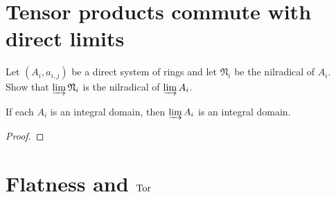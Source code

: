 \section*{Tensor products commute with direct limits}




\begin{exercise}
\label{ex:2.20}

\end{exercise}




\begin{exercise}
\label{ex:2.21}

\end{exercise}




\begin{exercise}
\label{ex:2.22}
Let $(A_i, a_{i,j})$ be a direct system of rings and let $\mathfrak N_i$ be the nilradical of $A_i$.
Show that $\varinjlim \mathfrak N_i$ is the nilradical of $\varinjlim A_i$.

If each $A_i$ is an integral domain, then $\varinjlim A_i$ is an integral domain.
\end{exercise}

\begin{proof}

\end{proof}


\begin{exercise}
\label{ex:2.23}

\end{exercise}



\section*{Flatness and $\operatorname{Tor}$}




\begin{exercise}
\label{ex:2.24}

\end{exercise}




\begin{exercise}
\label{ex:2.25}

\end{exercise}




\begin{exercise}
\label{ex:2.26}

\end{exercise}




\begin{exercise}
\label{ex:2.27}

\end{exercise}




\begin{exercise}
\label{ex:2.28}

\end{exercise}
















